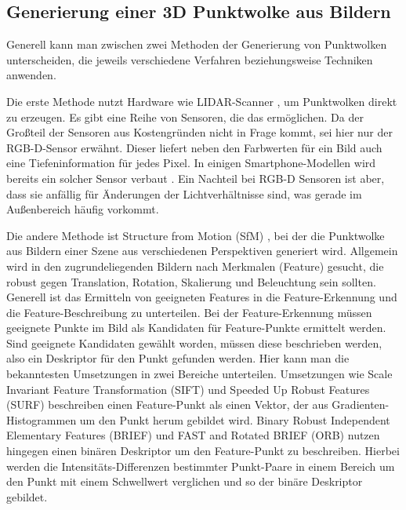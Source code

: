 \documentclass[12pt,titlepage, twoside]{article}
\begin{document}
\subsection{Generierung einer 3D Punktwolke aus Bildern}
\label{sec:stand:pointcloud}

Generell kann man zwischen zwei Methoden der Generierung von Punktwolken unterscheiden, die jeweils verschiedene Verfahren beziehungsweise Techniken anwenden.

Die erste Methode nutzt Hardware wie LIDAR-Scanner \cite{lidar}, um Punktwolken direkt zu erzeugen. Es gibt eine Reihe von Sensoren, die das ermöglichen. 
Da der Großteil der Sensoren aus Kostengründen nicht in Frage kommt, sei hier nur der RGB-D-Sensor erwähnt. 
Dieser liefert neben den Farbwerten für ein Bild auch eine Tiefeninformation für jedes Pixel. In einigen Smartphone-Modellen wird bereits ein solcher Sensor verbaut \cite{rgbd_smartphones}.
Ein Nachteil bei RGB-D Sensoren ist aber, dass sie anfällig für Änderungen der Lichtverhältnisse sind, was gerade im Außenbereich häufig vorkommt.

Die andere Methode ist Structure from Motion (SfM) \cite{sfm}, bei der die Punktwolke aus Bildern einer Szene aus verschiedenen Perspektiven generiert wird. 
Allgemein wird in den zugrundeliegenden Bildern nach Merkmalen (Feature) gesucht, die robust gegen Translation, Rotation, Skalierung und Beleuchtung sein sollten. 
Generell ist das Ermitteln von geeigneten Features in die Feature-Erkennung und die Feature-Beschreibung zu unterteilen. 
Bei der Feature-Erkennung müssen geeignete Punkte im Bild als Kandidaten für Feature-Punkte ermittelt werden. 
Sind geeignete Kandidaten gewählt worden, müssen diese beschrieben werden, also ein Deskriptor für den Punkt gefunden werden. Hier kann man die bekanntesten Umsetzungen in zwei Bereiche unterteilen. 
Umsetzungen wie Scale Invariant Feature Transformation (SIFT) \cite{Sift} und Speeded Up Robust Features (SURF) \cite{SURF} beschreiben einen Feature-Punkt als einen Vektor, der aus Gradienten-Histogrammen um den Punkt herum gebildet wird.
Binary Robust Independent Elementary Features (BRIEF) \cite{BRIEF} und FAST and Rotated BRIEF (ORB) \cite{ORB} nutzen hingegen einen binären Deskriptor um den Feature-Punkt zu beschreiben. 
Hierbei werden die Intensitäts-Differenzen bestimmter Punkt-Paare in einem Bereich um den Punkt mit einem Schwellwert verglichen und so der binäre Deskriptor gebildet.
\end{document}
